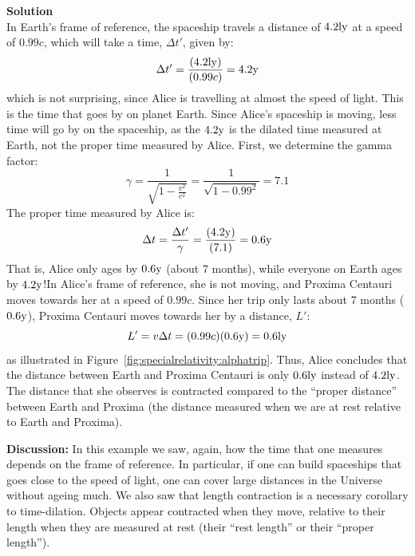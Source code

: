 \begin{framed}
\begin{framed}
\textbf{Solution}\\
In Earth's frame of reference, the spaceship travels a distance of $4.2 {\rm ly}$ at a speed of $0.99c$, which will take a time, $\Delta t'$, given by:
\begin{equation}
\Delta t' = \frac{(4.2 {\rm ly})}{(0.99c)}=4.2 {\rm y}
\end{equation}
which is not surprising, since Alice is travelling at almost the speed of light. This is the time that goes by on planet Earth. Since Alice's spaceship is moving, less time will go by on the spaceship, as the $4.2 {\rm y}$ is the dilated time measured at Earth, not the proper time measured by Alice. First, we determine the gamma factor:
\begin{equation}
\gamma = \frac{1}{\sqrt{1-\frac{v^2}{c^2}}} =\frac{1}{\sqrt{1-0.99^2}}=7.1
\end{equation}
The proper time measured by Alice is:
\begin{equation}
\Delta t = \frac{\Delta t'}{\gamma}=\frac{(4.2 {\rm y})}{(7.1)}=0.6 {\rm y}
\end{equation}
That is, Alice only ages by $0.6 {\rm y}$ (about 7 months), while everyone on Earth ages by $4.2 {\rm y}$!In Alice's frame of reference, she is not moving, and Proxima Centauri moves towards her at a speed of $0.99c$. Since her trip only lasts about 7 months ($0.6 {\rm y}$), Proxima Centauri moves towards her by a distance, $L'$:
\begin{equation}
L'=v\Delta t=(0.99c)(0.6 {\rm y})=0.6 {\rm ly}
\end{equation}
as illustrated in Figure~\ref{fig:specialrelativity:alphatrip}. Thus, Alice concludes that the distance between Earth and Proxima Centauri is only $0.6 {\rm ly}$ instead of $4.2 {\rm ly}$. The distance that she observes is contracted compared to the ``proper distance'' between Earth and Proxima (the distance measured when we are at rest relative to Earth and Proxima).

\textbf{Discussion:} In this example we saw, again, how the time that one measures depends on the frame of reference. In particular, if one can build spaceships that goes close to the speed of light, one can cover large distances in the Universe without ageing much. We also saw that length contraction is a necessary corollary to time-dilation. Objects appear contracted when they move, relative to their length when they are measured at rest (their ``rest length'' or their ``proper length'').
\end{framed}
\end{framed}

